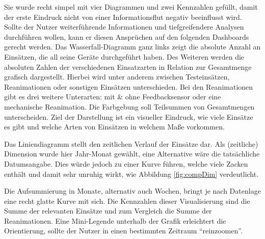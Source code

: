 Sie wurde recht simpel mit vier Diagrammen und zwei Kennzahlen gefüllt, damit der erste Eindruck nicht von einer Informationsflut negativ beeinflusst wird.
Sollte der Nutzer weiterführende Informationen und tiefgreifendere Analysen durchführen wollen, kann er diesen Ansprüchen auf den folgenden Dashboards gerecht werden.
Das Wasserfall-Diagramm ganz links zeigt die absolute Anzahl an Einsätzen, die all seine Geräte durchgeführt haben.
Des Weiteren werden die absoluten Zahlen der verschiedenen Einsatzarten in Relation zur Gesamtmenge grafisch dargestellt.
Hierbei wird unter anderem zwischen Testeinsätzen, Reanimationen oder sonstigen Einsätzen unterschieden.
Bei den Reanimationen gibt es drei weitere Unterarten: mit \& ohne Feedbacksensor oder eine mechanische Reanimation.
Die Farbgebung soll Teilsummen von Gesamtmengen unterscheiden.
Ziel der Darstellung ist ein visueller Eindruck, wie viele Einsätze es gibt und welche Arten von Einsätzen in welchem Maße vorkommen.

Das Liniendiagramm stellt den zeitlichen Verlauf der Einsätze dar.
Als (zeitliche) Dimension wurde hier Jahr-Monat gewählt, eine Alternative wäre die tatsächliche Datumsangabe.
Dies würde jedoch zu einer Kurve führen, welche viele Zacken enthält und damit sehr unruhig wirkt, wie Abbildung \ref{fig:compDim} verdeutlicht.


Die Aufsummierung in Monate, alternativ auch Wochen, bringt je nach Datenlage eine recht glatte Kurve mit sich. 
Die Kennzahlen dieser Visualisierung sind die Summe der relevanten Einsätze und zum Vergleich die Summe der Reanimationen. 
Eine Mini-Legende unterhalb der Grafik erleichtert die Orientierung, sollte der Nutzer in einen bestimmten Zeitraum "`reinzoomen"'.

